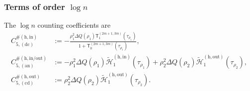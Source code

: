 \documentclass[a4paper]{article}
\numberwithin{equation}{section}
\begin{document}
\subsubsection{Terms of order \texorpdfstring{$\log n$}{log(n)}}
The $\log n$ counting coefficients are
\begin{align}
C_{5,(\mathrm{dc})}^{\#(\mathrm{h,in})}
&:=-
\frac{\rho_1^2\Delta Q(\rho_1)\mathsf{T}_{1}^{(2m+1,3m)}(\tau_{\rho_1})}{1+\mathsf{T}_{0}^{(2m+1,3m)}(\tau_{\rho_1})},
\\
  C_{5,(\mathrm{an})}^{\#(\mathrm{h,in/out})}
    &:=
    -
\rho_1^2\Delta Q(\rho_1)\widetilde{\mathcal{H}}_{1}^{(\mathrm{h,in})}(\tau_{\rho_1})
+
\rho_2^2\Delta Q(\rho_2)\widetilde{\mathcal{H}}_{1}^{(\mathrm{h,out})}(\tau_{\rho_2}),
\\
C_{5,(\mathrm{cd})}^{\#(\mathrm{h,out})}
&:=\rho_2^2\Delta Q(\rho_2)\widetilde{\mathcal{H}}_1^{(\mathrm{h,out})}(\tau_{\rho_2}).
\end{align}
\end{document}
